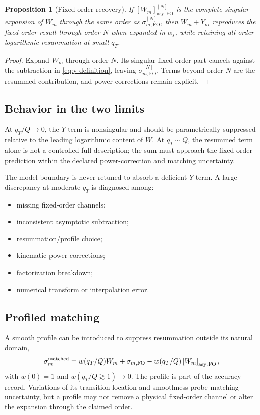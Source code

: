 \documentclass[11pt]{article}
\newtheorem{proposition}[definition]{Proposition}
\newcommand{\FO}{\mathrm{FO}}
\newcommand{\asy}{\mathrm{asy}}
\begin{document}
\begin{proposition}[Fixed-order recovery]
If \(\left[W_m\right]_{\asy,\FO}^{[N]}\) is the complete singular expansion of
\(W_m\) through the same order as \(\sigma_{m,\FO}^{[N]}\), then
\(W_m+Y_m\) reproduces the fixed-order result through order \(N\) when
expanded in \(\alpha_s\), while retaining all-order logarithmic resummation at
small \(q_T\).
\end{proposition}

\begin{proof}
Expand \(W_m\) through order \(N\).  Its singular fixed-order part cancels
against the subtraction in \cref{eq:y-definition}, leaving
\(\sigma_{m,\FO}^{[N]}\).  Terms beyond order \(N\) are the resummed
contribution, and power corrections remain explicit.
\end{proof}

\subsection{Behavior in the two limits}

At \(q_T/Q\to0\), the \(Y\) term is nonsingular and should be parametrically
suppressed relative to the leading logarithmic content of \(W\).  At
\(q_T\sim Q\), the resummed term alone is not a controlled full description;
the sum must approach the fixed-order prediction within the declared
power-correction and matching uncertainty.

The model boundary is never retuned to absorb a deficient \(Y\) term.  A
large discrepancy at moderate \(q_T\) is diagnosed among:
\begin{itemize}
\item missing fixed-order channels;
\item inconsistent asymptotic subtraction;
\item resummation/profile choice;
\item kinematic power corrections;
\item factorization breakdown;
\item numerical transform or interpolation error.
\end{itemize}

\subsection{Profiled matching}

A smooth profile can be introduced to suppress resummation outside its natural
domain,
\begin{equation}
 \sigma_m^{\rm matched}
 =w(q_T/Q)W_m
 +\sigma_{m,\FO}
 -w(q_T/Q)\left[W_m\right]_{\asy,\FO},
 \label{eq:profiled-wy}
\end{equation}
with \(w(0)=1\) and \(w(q_T/Q\gtrsim1)\to0\).  The profile is part of the
accuracy record.  Variations of its transition location and smoothness probe
matching uncertainty, but a profile may not remove a physical fixed-order
channel or alter the expansion through the claimed order.
\end{document}
